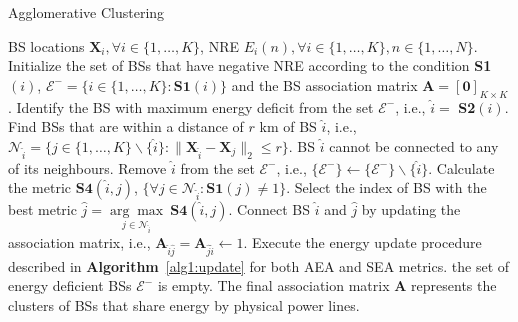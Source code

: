 \documentclass[10pt, letter,twocolumn]{IEEEtran}
\begin{document}
\begin{algorithm}[h]
\small
\renewcommand{\thealgorithm}{1a}
\caption{Agglomerative Clustering}
\label{alg1:Agglomerative_algo}
\begin{algorithmic}[1]
\Require BS locations $\mathbf{X}_{i}, \forall i \in \{1,\ldots,K\}$, NRE $E_{i}(n), \forall i \in \{1,\ldots,K\},n \in \{1,\ldots,N\}$.
\State Initialize the set of BSs that have negative NRE according to the condition \textbf{S1}$(i)$, $\mathcal{E}^{-}=\{i \in \{1,\ldots,K\} : \textbf{S1}(i)\}$ and the BS association matrix $\mathbf{A}= [\boldsymbol{0}]_{K \times K}$.
\Repeat \label{repeat_start}
\State Identify the BS with maximum energy deficit from the set $\mathcal{E}^{-}$, i.e., $\hat{i} =$ \textbf{S2}$(i)$.
\State Find BSs that are within a distance of $r$ km of BS $\hat{i}$, i.e., $\mathcal{N}_{\hat{i}} = \{ j \in \{1,\ldots,K\}\backslash \{\hat{i}\} : \|\mathbf{X}_{\hat{i}} - \mathbf{X}_{j} \|_{2} \leq r  \}$. \label{norm_notation}
 \label{check_all_deficient}
\State BS $\hat{i}$ cannot be connected to any of its neighbours. Remove $\hat{i}$ from the set $\mathcal{E}^{-}$, i.e., $\{\mathcal{E}^{-}\} \gets \{\mathcal{E}^{-}\}\backslash \{\hat{i}\}$.\label{remove_BS_1}
\Else
\State Calculate the metric $\textbf{S4}(\hat{i},j)$, $\{ \forall j \in \mathcal{N}_{\hat{i}}: \textbf{S1}(j) \neq 1\}$.
\State Select the index of BS with the best metric $\hat{j} =  \underset{j \in \mathcal{N}_{\hat{i}}}{\arg \max} \ \textbf{S4}(\hat{i},j)$.
\State Connect BS $\hat{i}$ and $\hat{j}$ by updating the association matrix, i.e., $\mathbf{A}_{\hat{i}\hat{j}} = \mathbf{A}_{\hat{j}\hat{i}} \gets  1$.
\State Execute the energy update procedure described in \textbf{Algorithm}~\ref{alg1:update} for both AEA and SEA metrics.
\EndIf
\Until the set of energy deficient BSs $\mathcal{E}^{-}$ is empty. \label{repeat_end}
\State The final association matrix $\mathbf{A}$ represents the clusters of BSs that share energy by physical power lines.
\end{algorithmic}
\end{algorithm}
\normalsize
\end{document}
